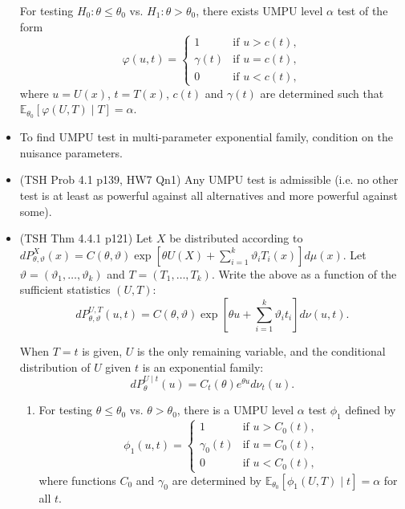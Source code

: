 \documentclass[twoside]{article}
\newcommand{\dis}{\displaystyle}
\newcommand\bbE{\mathbb{E}}
\def\t{\theta}
\newcommand\vt{\vartheta}
\begin{document}
\begin{itemize}
For testing $H_0: \t \leq \t_0$ vs. $H_1: \t > \t_0$, there exists  UMPU level $\alpha$ test of the form
\begin{equation*} \varphi(u, t) = \begin{cases} 1 &\text{if } u > c(t), \\ \gamma(t) &\text{if } u = c(t), \\ 0 &\text{if } u < c(t),  \end{cases}  \end{equation*}
where $u = U(x)$, $t = T(x)$, $c(t)$ and $\gamma(t)$ are determined such that $\bbE_{\t_0} [\varphi(U, T) \mid T] = \alpha$.

\item To find UMPU test in multi-parameter exponential family, condition on the nuisance parameters.

\item (TSH Prob 4.1 p139, HW7 Qn1) Any UMPU test is admissible (i.e. no other test is at least as powerful against all alternatives and more powerful against some).

\item (TSH Thm 4.4.1 p121) Let $X$ be distributed according to $dP_{\t, \vt}^X (x) = C(\t, \vt) \exp \left[\t U(X) + \dis\sum_{i=1}^k \vt_i T_i(x) \right] d\mu(x)$. Let $\vt = (\vt_1, \dots, \vt_k)$ and $T = (T_1, \dots, T_k)$. Write the above as a function of the sufficient statistics $(U, T)$:
\[ dP_{\t, \vt}^{U, T} (u,t) = C(\t, \vt) \exp \left[\t u + \dis\sum_{i=1}^k \vt_i t_i \right] d\nu(u, t). \]

When $T = t$ is given, $U$ is the only remaining variable, and the conditional distribution of $U$ given $t$ is an exponential family:
\[ dP_\t^{U \mid t}(u) = C_t(\t) e^{\t u } d\nu_t(u). \]

\begin{enumerate}[label=(\roman*)]
\item For testing $\t \leq \t_0$ vs. $\t > \t_0$, there is a UMPU level $\alpha$ test $\phi_1$ defined by
\begin{equation*} \phi_1(u,t) = \begin{cases} 1 &\text{if } u > C_0(t), \\ 
\gamma_0(t) &\text{if } u = C_0(t), \\
0 &\text{if } u < C_0(t),
\end{cases}  \end{equation*}
where functions $C_0$ and $\gamma_0$ are determined by $\bbE_{\t_0}[\phi_1(U,T)\mid t] = \alpha$ for all $t$.


\end{enumerate}
\end{itemize}
\end{document}
